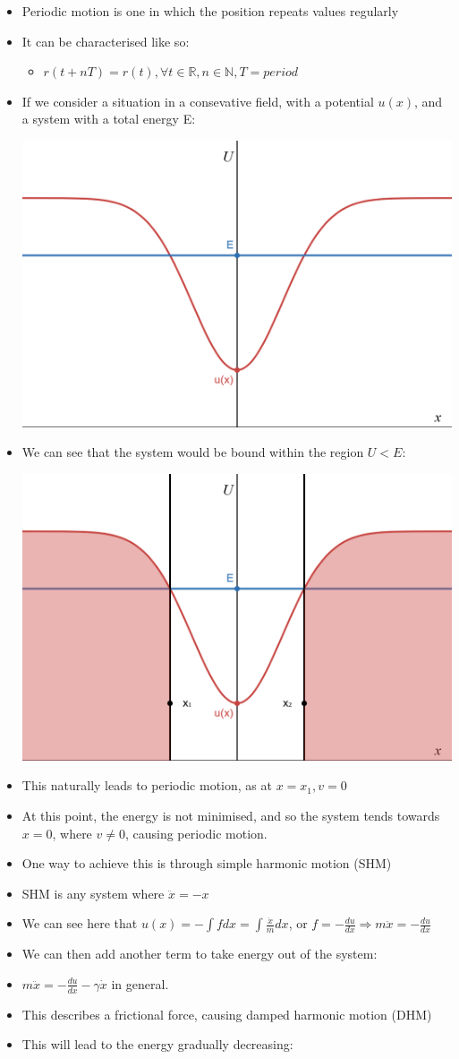 \documentclass{article}
\begin{document}
\begin{itemize}
    \item Periodic motion is one in which the position repeats values regularly
    \item It can be characterised like so:
    \begin{itemize}
        \item[] \(r(t + nT) = r(t), \forall t\in\mathbb{R}, n\in\mathbb{N}, T=period\)
    \end{itemize}
    \item If we consider a situation in a consevative field, with a potential \(u(x)\), and a system with a total energy E:

    \includegraphics[width = 0.5\linewidth]{year1/wfmp/periodic-motion/potential-without-bounds.png}

    \item We can see that the system would be bound within the region $U < E$: 

    \includegraphics[width = 0.5\linewidth]{year1/wfmp/periodic-motion/potential-with-bounds.png}

    \item This naturally leads to periodic motion, as at \(x = x_1, v = 0\)
    \item At this point, the energy is not minimised, and so the system tends towards \(x = 0\), 
    where \(v \not= 0\), causing periodic motion. 
    

    \item One way to achieve this is through simple harmonic motion (SHM)
    \item SHM is any system where \(\ddot x = -x\)
    \item We can see here that \(u(x) = -\int f dx = \int\frac{\ddot x}{m}dx\), 
    or \(f = -\frac{du}{dx} \Rightarrow m\ddot x = -\frac{du}{dx}\)
    \item We can then add another term to take energy out of the system:
    \item \(m\ddot x = -\frac{du}{dx} - \gamma\dot x\) in general. 
    \item This describes a frictional force, causing damped harmonic motion (DHM)
    \item This will lead to the energy gradually decreasing:
    

\end{itemize}
\end{document}
